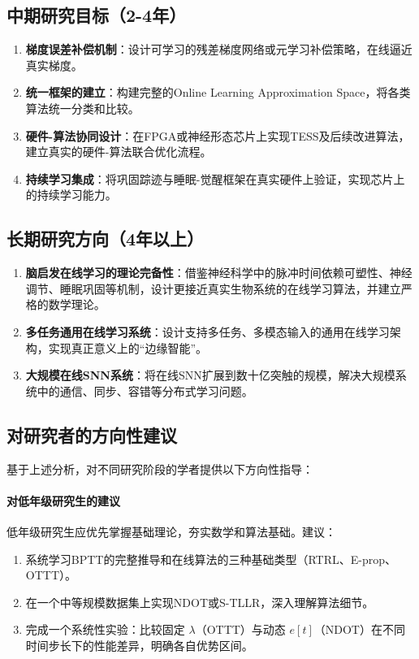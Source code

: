 \documentclass[journal,12pt,onecolumn]{IEEEtran}
\begin{document}
\subsection{中期研究目标（2-4年）}

\begin{enumerate}
    \item \textbf{梯度误差补偿机制}：设计可学习的残差梯度网络或元学习补偿策略，在线逼近真实梯度。
    \item \textbf{统一框架的建立}：构建完整的Online Learning Approximation Space，将各类算法统一分类和比较。
    \item \textbf{硬件-算法协同设计}：在FPGA或神经形态芯片上实现TESS及后续改进算法，建立真实的硬件-算法联合优化流程。
    \item \textbf{持续学习集成}：将巩固踪迹与睡眠-觉醒框架在真实硬件上验证，实现芯片上的持续学习能力。
\end{enumerate}

\subsection{长期研究方向（4年以上）}

\begin{enumerate}
    \item \textbf{脑启发在线学习的理论完备性}：借鉴神经科学中的脉冲时间依赖可塑性、神经调节、睡眠巩固等机制，设计更接近真实生物系统的在线学习算法，并建立严格的数学理论。
    \item \textbf{多任务通用在线学习系统}：设计支持多任务、多模态输入的通用在线学习架构，实现真正意义上的“边缘智能”。
    \item \textbf{大规模在线SNN系统}：将在线SNN扩展到数十亿突触的规模，解决大规模系统中的通信、同步、容错等分布式学习问题。
\end{enumerate}

\subsection{对研究者的方向性建议}

基于上述分析，对不同研究阶段的学者提供以下方向性指导：

\paragraph{对低年级研究生的建议}
低年级研究生应优先掌握基础理论，夯实数学和算法基础。建议：
\begin{enumerate}
    \item 系统学习BPTT的完整推导和在线算法的三种基础类型（RTRL、E-prop、OTTT）。
    \item 在一个中等规模数据集上实现NDOT或S-TLLR，深入理解算法细节。
    \item 完成一个系统性实验：比较固定 \(\lambda\)（OTTT）与动态 \(e[t]\)（NDOT）在不同时间步长下的性能差异，明确各自优势区间。
\end{enumerate}
\end{document}
